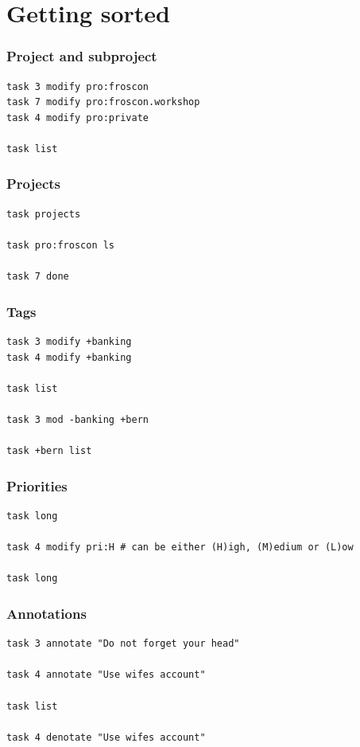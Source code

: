 \documentclass[t,handout]{beamer}
\begin{document}
\section{Getting sorted}

\begin{frame}[fragile]\frametitle{Project and subproject}
    \vfill
    \begin{lstlisting}
task 3 modify pro:froscon
task 7 modify pro:froscon.workshop
task 4 modify pro:private

task list
\end{lstlisting}
\end{frame}

\begin{frame}[fragile]\frametitle{Projects}
    \vfill
    \begin{lstlisting}
task projects

task pro:froscon ls

task 7 done
\end{lstlisting}
\end{frame}

\begin{frame}[fragile]\frametitle{Tags}
    \vfill
    \begin{lstlisting}
task 3 modify +banking
task 4 modify +banking

task list

task 3 mod -banking +bern

task +bern list
\end{lstlisting}
\end{frame}

\begin{frame}[fragile]\frametitle{Priorities}
    \vfill
    \begin{lstlisting}
task long

task 4 modify pri:H # can be either (H)igh, (M)edium or (L)ow

task long
\end{lstlisting}
\end{frame}

\begin{frame}[fragile]\frametitle{Annotations}
    \vfill
    \begin{lstlisting}
task 3 annotate "Do not forget your head"

task 4 annotate "Use wifes account"

task list

task 4 denotate "Use wifes account"
\end{lstlisting}
\end{frame}
\end{document}
